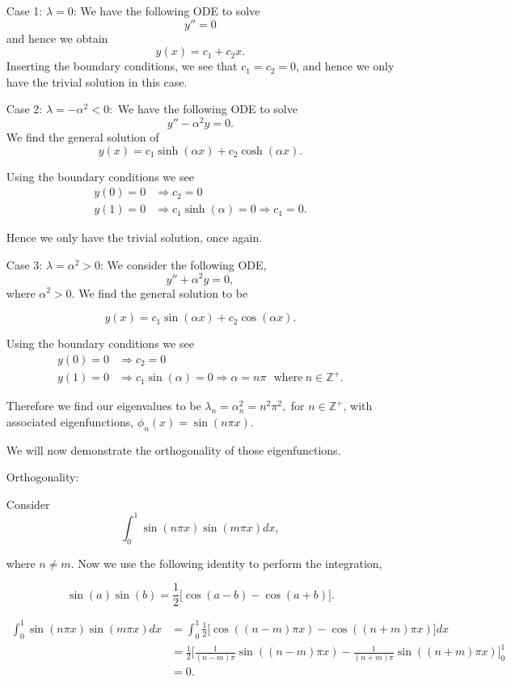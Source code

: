 \begin{itemize}
\item[Case 1: ] $\lambda = 0$: We have the following ODE to solve $$y'' = 0$$ and hence we obtain $$y(x) = c_1 + c_2 x.$$
Inserting the boundary conditions, we see that $c_1 = c_2 = 0$, and hence we only have the trivial solution in this case. 

\item[Case 2: ] $\lambda = -\alpha^2 < 0:$ We have the following ODE to solve $$y'' - \alpha^2 y = 0.$$  We find the general solution of $$y(x) = c_1 \sinh(\alpha x) + c_2 \cosh(\alpha x).$$

Using the boundary conditions we see
\begin{align*}
y(0)=0 &\Rightarrow c_2 = 0 \\
y(1)=0 &\Rightarrow c_1 \sinh(\alpha) = 0 \Rightarrow c_1 = 0. 
\end{align*}

Hence we only have the trivial solution, once again.

\item[Case 3: ] $\lambda = \alpha^2 > 0$: We consider the following ODE, $$y''+\alpha^2 y= 0,$$ where $\alpha^2>0$. We find the general solution to be

$$y(x) = c_1 \sin(\alpha x) + c_2 \cos(\alpha x).$$

Using the boundary conditions we see
\begin{align*}
y(0)=0 &\Rightarrow c_2 = 0 \\
y(1)=0 &\Rightarrow c_1 \sin(\alpha) = 0 \Rightarrow \alpha = n\pi \ \ \ \mbox{where}\ n\in\mathbb{Z}^{+}. 
\end{align*}

Therefore we find our eigenvalues to be $\lambda_n = \alpha_n^2 = n^2\pi^2,$ for $n\in\mathbb{Z}^{+}$, with associated eigenfunctions, $\phi_n(x) = \sin(n\pi x).$
%


We will now demonstrate the orthogonality of those eigenfunctions.

\item[Orthogonality: ]

Consider $$\int_0^1 \sin(n\pi x) \sin(m \pi x) dx,$$

where $n\neq m.$ Now we use the following identity to perform the integration,

$$\sin(a)\sin(b) = \frac{1}{2} \Big[ \cos(a-b) - \cos(a+b) \Big].$$

\begin{align*}
\int_0^1 \sin(n\pi x) \sin(m \pi x) dx &= \int_0^1   \frac{1}{2} \Big[ \cos( (n-m)\pi x) - \cos( (n+m)\pi x) \Big]  dx \\
%
&= \frac{1}{2} \Big[ \frac{1}{(n-m)\pi}  \sin( (n-m)\pi x) - \frac{1}{(n+m)\pi}  \sin( (n+m)\pi x)  \Big]_0^1 \\
%
&= 0.
\end{align*}


\end{itemize}
